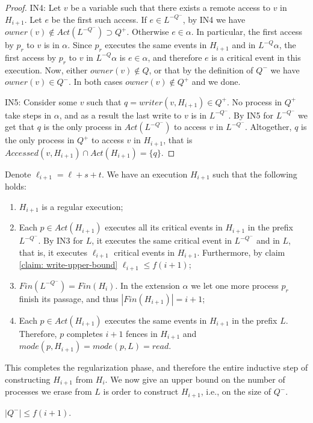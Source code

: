\begin{proof}
	IN4: Let $v$ be a variable such that there exists a remote access to $v$ in $H_{i+1}$. Let $e$ be the first such access. If $e \in L^{-Q^-}$, by IN4 we have $owner(v) \notin Act(L^{-Q^-}) \supset Q^+$. Otherwise $e \in \alpha$. In particular, the first access by $p_r$ to $v$ is in $\alpha$. Since $p_r$ executes the same events in $H_{i+1}$ and in $L^{-Q} \alpha$, the first access by $p_r$ to $v$ in $L^{-Q} \alpha$ is $e \in \alpha$, and therefore $e$ is a critical event in this execution. Now, either $owner(v) \notin Q$, or that by the definition of $Q^-$ we have $owner(v) \in Q^-$. In both cases $owner(v) \notin Q^+$ and we done.
	
	IN5: Consider some $v$ such that $q = writer(v,H_{i+1}) \in Q^+$. No process in $Q^+$ take steps in $\alpha$, and as a result the last write to $v$ is in $L^{-Q^-}$. By IN5 for $L^{-Q^-}$ we get that $q$ is the only process in $Act(L^{-Q^-})$ to access $v$ in $L^{-Q^-}$. Altogether, $q$ is the only process in $Q^+$ to access $v$ in $H_{i+1}$, that is $Accessed(v,H_{i+1}) \cap Act(H_{i+1}) = \{q\}$.
\end{proof}

Denote $\ell_{i+1} = \ell+s+t$. We have an execution $H_{i+1}$ such that the following holds:
\begin{enumerate}
	\item $H_{i+1}$ is a regular execution;
	\item Each $p \in Act(H_{i+1})$ executes all its critical events in $H_{i+1}$ in the prefix $L^{-Q^-}$. By IN3 for $L$, it executes the same critical event in $L^{-Q^-}$ and in $L$, that is, it executes $\ell_{i+1}$ critical events in $H_{i+1}$. Furthermore, by claim \ref{claim: write-upper-bound} $\ell_{i+1} \leq f(i+1)$;
	\item $Fin(L^{-Q^-}) = Fin(H_i)$. In the extension $\alpha$ we let one more process $p_r$ finish its passage, and thus $|Fin(H_{i+1})| = i+1$;
	\item Each $p \in Act(H_{i+1})$ executes the same events in $H_{i+1}$ in the prefix $L$. Therefore, $p$ completes $i+1$ fences in $H_{i+1}$ and $mode(p,H_{i+1}) = mode(p,L) = read$.
\end{enumerate}

This completes the regularization phase, and therefore the entire inductive step of constructing $H_{i+1}$ from $H_i$. We now give an upper bound on the number of processes we erase from $L$ is order to construct $H_{i+1}$, i.e., on the size of $Q^-$.

\begin{claim-subsection}
	$|Q^-| \leq f(i+1)$.
\end{claim-subsection}

